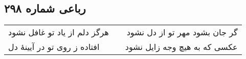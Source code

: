 \begin{center}
\section*{رباعی شماره ۲۹۸}
\label{sec:sh298}
\begin{longtable}{l p{0.5cm} r}
هرگز دلم از یاد تو غافل نشود
&&
گر جان بشود مهر تو از دل نشود
\\
افتاده ز روی تو در آیینهٔ دل
&&
عکسی که به هیچ وجه زایل نشود
\\
\end{longtable}
\end{center}
